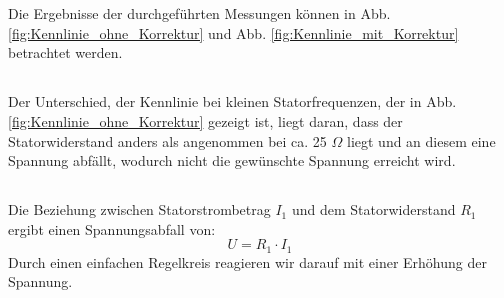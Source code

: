 \chapter{}\label{ex:aufg7}
%
\section{}\label{sec:aufg7a}
Die Ergebnisse der durchgeführten Messungen können in Abb. \ref{fig:Kennlinie_ohne_Korrektur} und Abb. \ref{fig:Kennlinie_mit_Korrektur} betrachtet werden.
\section{}\label{sec:aufg7b}
Der Unterschied, der Kennlinie bei kleinen Statorfrequenzen, der in Abb. \ref{fig:Kennlinie_ohne_Korrektur} gezeigt ist, liegt daran, dass der Statorwiderstand anders als angenommen bei ca. 25 $\Omega$ liegt und an diesem eine Spannung abfällt, wodurch nicht die gewünschte Spannung erreicht wird.
\section{}\label{sec:aufg7c}
Die Beziehung zwischen Statorstrombetrag $I_1$ und dem Statorwiderstand $R_1$ ergibt einen Spannungsabfall von:
\begin{equation}
	U = R_1 \cdot I_1
\end{equation}
Durch einen einfachen Regelkreis reagieren wir darauf mit einer Erhöhung der Spannung. 
